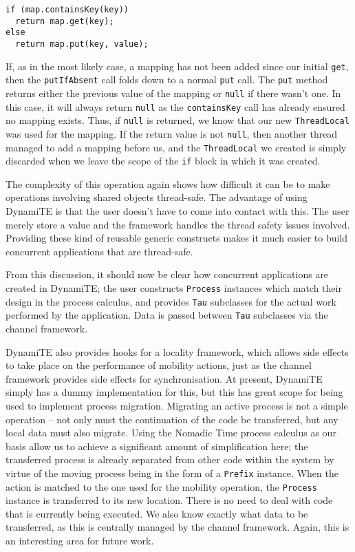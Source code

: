 \begin{verbatim}
if (map.containsKey(key))
  return map.get(key);
else
  return map.put(key, value);
\end{verbatim}

If, as in the most likely case, a mapping has not been added since our
initial \texttt{get}, then the \texttt{putIfAbsent} call folds down to
a normal \texttt{put} call.  The \texttt{put} method returns either
the previous value of the mapping or \texttt{null} if there wasn't
one.  In this case, it will always return \texttt{null} as the
\texttt{containsKey} call has already ensured no mapping exists.
Thus, if \texttt{null} is returned, we know that our new
\texttt{ThreadLocal} was used for the mapping.  If the return value is
not \texttt{null}, then another thread managed to add a mapping before
us, and the \texttt{ThreadLocal} we created is simply discarded when
we leave the scope of the \texttt{if} block in which it was created.

The complexity of this operation again shows how difficult it can be
to make operations involving shared objects thread-safe.  The
advantage of using DynamiTE is that the user doesn't have to come into
contact with this.  The user merely store a value and the framework
handles the thread safety issues involved.  Providing these kind of
reusable generic constructs makes it much easier to build concurrent
applications that are thread-safe.

From this discussion, it should now be clear how concurrent
applications are created in DynamiTE; the user constructs
\texttt{Process} instances which match their design in the process
calculus, and provides \texttt{Tau} subclasses for the actual work
performed by the application.  Data is passed between \texttt{Tau}
subclasses via the channel framework.

DynamiTE also provides hooks for a locality framework, which allows
side effects to take place on the performance of mobility actions,
just as the channel framework provides side effects for
synchronisation.  At present, DynamiTE simply has a dummy
implementation for this, but this has great scope for being used to
implement process migration.  Migrating an active process is not a
simple operation -- not only must the continuation of the code be
transferred, but any local data must also migrate.  Using the Nomadic
Time process calculus as our basis allow us to achieve a significant
amount of simplification here; the transferred process is already
separated from other code within the system by virtue of the moving
process being in the form of a \texttt{Prefix} instance.  When the
action is matched to the one used for the mobility operation, the
\texttt{Process} instance is transferred to its new location.  There
is no need to deal with code that is currently being executed.  We
also know exactly what data to be transferred, as this is centrally
managed by the channel framework.  Again, this is an interesting area
for future work.

